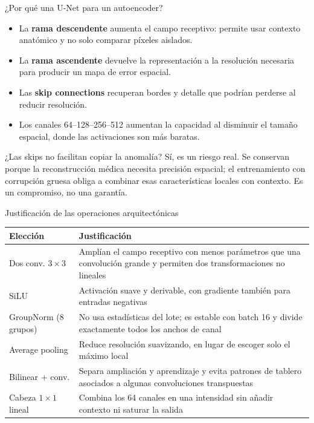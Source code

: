 \documentclass[10pt,aspectratio=169]{beamer}
\begin{document}
\begin{frame}{¿Por qué una U-Net para un autoencoder?}
  \begin{itemize}
    \item La \textbf{rama descendente} aumenta el campo receptivo: permite usar
          contexto anatómico y no solo comparar píxeles aislados.
    \item La \textbf{rama ascendente} devuelve la representación a la resolución
          necesaria para producir un mapa de error espacial.
    \item Las \textbf{skip connections} recuperan bordes y detalle que podrían
          perderse al reducir resolución.
    \item Los canales 64--128--256--512 aumentan la capacidad al disminuir el
          tamaño espacial, donde las activaciones son más baratas.
  \end{itemize}

  \begin{alertblock}{¿Las skips no facilitan copiar la anomalía?}
    Sí, es un riesgo real. Se conservan porque la reconstrucción médica necesita
    precisión espacial; el entrenamiento con corrupción gruesa obliga a combinar
    esas características locales con contexto. Es un compromiso, no una garantía.
  \end{alertblock}
\end{frame}

\begin{frame}{Justificación de las operaciones arquitectónicas}
  \small
  \begin{tabular}{p{3.0cm}p{8.8cm}}
    \toprule
    Elección & Justificación \\
    \midrule
    Dos conv. $3\times3$ & Amplían el campo receptivo con menos parámetros que una convolución grande y permiten dos transformaciones no lineales \\
    SiLU & Activación suave y derivable, con gradiente también para entradas negativas \\
    GroupNorm (8 grupos) & No usa estadísticas del lote; es estable con batch 16 y divide exactamente todos los anchos de canal \\
    Average pooling & Reduce resolución suavizando, en lugar de escoger solo el máximo local \\
    Bilinear + conv. & Separa ampliación y aprendizaje y evita patrones de tablero asociados a algunas convoluciones transpuestas \\
    Cabeza $1\times1$ lineal & Combina los 64 canales en una intensidad sin añadir contexto ni saturar la salida \\
    \bottomrule
  \end{tabular}
\end{frame}
\end{document}
